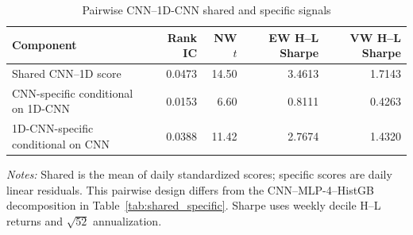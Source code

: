 \begin{table}[htbp]
\centering
\caption{Pairwise CNN--1D-CNN shared and specific signals}
\label{tab:temporal_decomposition}
\begin{tabular}{lrrrr}
\toprule
Component & Rank IC & NW $t$ & EW H--L Sharpe & VW H--L Sharpe \\
\midrule
Shared CNN--1D score & 0.0473 & 14.50 & 3.4613 & 1.7143 \\
CNN-specific conditional on 1D-CNN & 0.0153 & 6.60 & 0.8111 & 0.4263 \\
1D-CNN-specific conditional on CNN & 0.0388 & 11.42 & 2.7674 & 1.4320 \\
\bottomrule
\end{tabular}
\vspace{0.25em}
\footnotesize\textit{Notes:} Shared is the mean of daily standardized scores; specific scores are daily linear residuals. This pairwise design differs from the CNN--MLP-4--HistGB decomposition in Table~\ref{tab:shared_specific}. Sharpe uses weekly decile H--L returns and $\sqrt{52}$ annualization.
\end{table}
